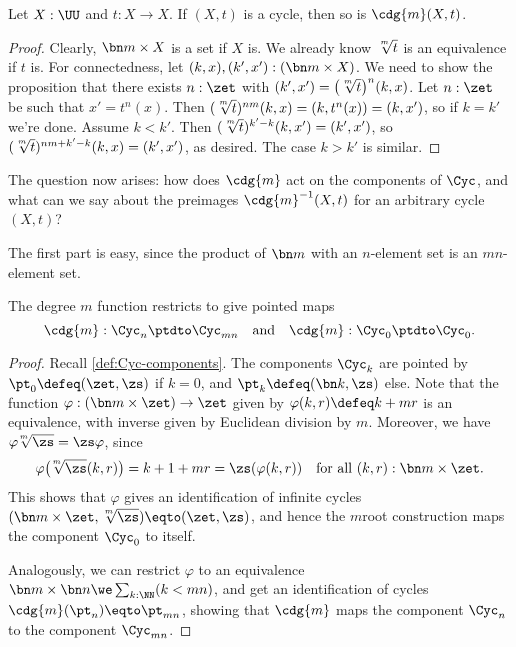 \begin{lemma} Let $X:\UU$ and $t:X\to X$.
  If $(X,t)$ is a cycle, then so is $\cdg{m}(X,t)$.
\end{lemma}
\begin{proof}
  Clearly, $\bn m\times X$ is a \nonempty set if $X$ is.
  We already know $\sqrt[\uproot{2}m]{t}$ is an equivalence if $t$ is.
  For connectedness, let $(k,x),(k',x'): (\bn m\times X)$.
  We need to show the proposition that there exists $n:\zet$
  with $(k',x') = \bigl(\sqrt[\uproot{2}m]t\bigr)^n(k,x)$.
  Let $n:\zet$ be such that $x' = t^n(x)$.
  Then $(\sqrt[\uproot{2}m]t)^{nm}(k,x) = (k,t^n(x)) = (k,x')$,
  so if $k=k'$ we're done.
  Assume $k<k'$. Then $(\sqrt[\uproot{2}m]t)^{k'-k}(k,x') = (k',x')$,
  so $(\sqrt[\uproot{2}m]t)^{nm+k'-k}(k,x) = (k',x')$, as desired.
  The case $k>k'$ is similar.
\end{proof}

The question now arises: how does $\cdg{m}$ act on the components of $\Cyc$,
and what can we say about the preimages $\cdg{m}^{-1}(X,t)$
for an arbitrary cycle $(X,t)$?

The first part is easy, since the product of $\bn m$ with an $n$-element set
is an $mn$-element set.
\begin{lemma} \label{lem:deg-m-on-Cyc}
  The degree $m$ function restricts to give pointed maps
  \[
    \cdg{m} : \Cyc_n \ptdto \Cyc_{mn} \quad\text{and}\quad
    \cdg{m} : \Cyc_0 \ptdto \Cyc_0.
  \]
\end{lemma}
\begin{proof}
  Recall \cref{def:Cyc-components}. The components $\Cyc_k$ are pointed
  by $\pt_0\defeq(\zet,\zs)$ if $k=0$, and $\pt_k\defeq(\bn k,\zs)$ else.
  Note
  that the function $\varphi : (\bn m\times \zet) \to \zet$
  given by $\varphi(k,r) \defeq k+mr$ is an equivalence,
  with inverse given by Euclidean division by $m$.
  Moreover, we have ${\varphi\!\sqrt[\uproot{2}m]\zs} = {\zs\varphi}$, since
  \[
    \varphi\bigl(\!\sqrt[\uproot{2}m]\zs(k,r)\bigr)
    = k+1+mr = \zs(\varphi(k,r))
    \quad\text{for all $(k,r):\bn m\times \zet$}.
  \]
  This shows that $\varphi$ gives an identification of infinite cycles
  $(\bn m\times\zet, \sqrt[\uproot{2}m]\zs) \eqto (\zet,\zs)$,
  and hence the $m$\th root construction maps the component $\Cyc_0$ to itself.

  Analogously, we can restrict $\varphi$ to
  an equivalence $\bn m \times \bn n \we \sum_{k:\NN}(k<mn)$,
  and get an identification of cycles $\cdg{m}(\pt_n) \eqto \pt_{mn}$,
  showing that $\cdg{m}$ maps the component $\Cyc_n$ to the component $\Cyc_{mn}$.
\end{proof}

